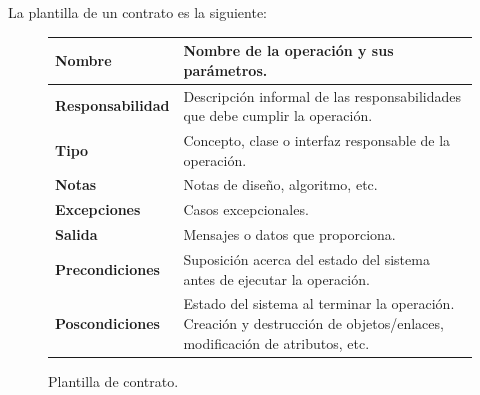 \documentclass[12pt,spanish]{article}
\begin{document}
La plantilla de un contrato es la siguiente:

\begin{figure}[H]
\centering
\begin{tabular}{|m{7.5cm}|m{7.5cm}|}
\hline
\textbf{Nombre} & Nombre de la operación y sus parámetros.\\
\hline
\textbf{Responsabilidad} & Descripción informal de las responsabilidades que debe cumplir la operación.\\
\hline
\textbf{Tipo} & Concepto, clase o interfaz responsable de la operación. \\
\hline
\textbf{Notas} & Notas de diseño, algoritmo, etc.  \\
\hline
\textbf{Excepciones} & Casos excepcionales. \\
\hline
\textbf{Salida} & Mensajes o datos que proporciona.\\
\hline
\textbf{Precondiciones} & Suposición acerca del estado del sistema antes de ejecutar la operación.\\
\hline
\textbf{Poscondiciones} & Estado del sistema al terminar la operación. Creación y destrucción de objetos/enlaces, modificación de atributos, etc.\\
\hline
\end{tabular}
\caption{Plantilla de contrato.}
\end{figure}
\end{document}
